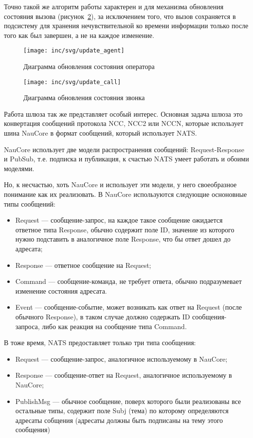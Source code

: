 Точно такой же алгоритм работы характерен и для механизма обновления состояния вызова (рисунок~\ref{pic:call:activity-update}),
за исключением того,
что вызов сохраняется в подсистему для хранения нечувствительной ко времени информации только после того как был завершен,
а не на каждое изменение.

\begin{figure}[!ht]
    \centering
    \texttt{[image: inc/svg/update\_agent]}
    \caption{Диаграмма обновления состояния оператора}
    \label{pic:agent:activity-update}
\end{figure}

\begin{figure}[!ht]
    \centering
    \texttt{[image: inc/svg/update\_call]}
    \caption{Диаграмма обновления состояния звонка}
    \label{pic:call:activity-update}
\end{figure}

Работа шлюза так же представляет особый интерес.
Основная задача шлюза это конвертация сообщений протокола NCC, NCC2 или NCCN,
которые использует шина NauCore в формат сообщений, который использует NATS.

NauCore использует две модели распространения сообщений: Request-Response и PubSub,
т.е. подписка и публикация, к счастью NATS умеет работать и обоими моделями.

Но, к несчастью, хоть NauCore и использует эти модели, у него своеобразное понимание как их реализовать.
В NauCore используются следующие осноновные типы сообщений:
\begin{itemize}
    \item Request --- сообщение-запрос, на каждое такое сообщение ожидается ответное типа Response,
    обычно содержит поле ID, значение из которого нужно подставить в аналогичное поле Response, что бы ответ дошел до адресата;
    \item Response --- ответное сообщение на Request;
    \item Command --- сообщение-команда, не требует ответа, обычно подразумевает изменение состояния адресата.
    \item Event --- сообщение-событие, может возникать как ответ на Request (после обычного Response),
    в таком случае должно содержать ID сообщения-запроса, либо как реакция на сообщение типа Command.
\end{itemize}

В тоже время, NATS предоставляет только три типа сообщения:
\begin{itemize}
    \item Request --- сообщение-запрос, аналогичное используемому в NauCore;
    \item Response --- сообщение-ответ на Request, аналогичное используемому в NauCore;
    \item PublishMsg --- обычное сообщение, поверх которого были реализованы все остальные типы,
    содержит поле Subj (тема) по которому определяются адресаты собщения (адресаты должны быть подписаны на тему этого сообщения)
\end{itemize}

